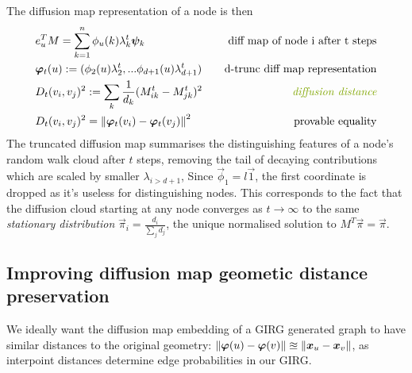 The diffusion map representation of a node is then
\begin{align*}
  & e_u^T M = \sum_{k=1}^n \phi_u(k) \lambda_k^t \vec{\psi}_k \quad & \text{diff map of node i after t steps}\\
  & \vec{\varphi}_t(u) := (\phi_2(u) \lambda_2^t,... \phi_{d+1}(u) \lambda_{d+1}^t) 
  \quad & \text{d-trunc diff map representation}
  \\
  & D_t(v_i, v_j)^2 := \sum_k \frac{1}{d_k} (M^t_{ik} - M^t_{jk})^2
  \quad & \text{\textit{diffusion distance}}
  \\
  & D_t(v_i, v_j)^2 = \norm{\vec{\varphi}_t(v_i) - \vec{\varphi}_t(v_j)}^2
  \quad & \text{provable equality}
\end{align*}
%
The truncated diffusion map summarises the distinguishing features of a node's random walk cloud after $t$ steps, removing the tail of decaying contributions which are scaled by smaller $\lambda_{i > d+1}$,
Since $\vec{\phi}_1 = l \vec{1}$, the first coordinate is dropped as it's useless for distinguishing nodes. This corresponds to the fact that the diffusion cloud starting at any node converges as $t \to \infty$ to the same \textit{stationary distribution} $\vec{\pi}_i = \frac{d_i}{\sum_j d_j}$, the unique normalised solution to $M^T \vec{\pi} = \vec{\pi}$.

\subsection{Improving diffusion map geometic distance preservation}
\label{sec:diff_map_geometry}
We ideally want the diffusion map embedding of a GIRG generated graph to have similar distances to the original geometry: $\left\lVert \bm{\varphi}(u) - \bm{\varphi}(v)\right\rVert \approxeq \left\lVert \bm{x}_u - \bm{x}_v\right\rVert$, as interpoint distances determine edge probabilities in our GIRG.



